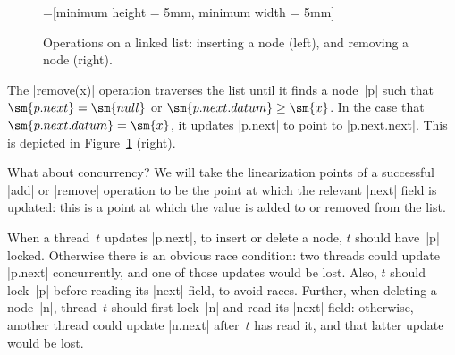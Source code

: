 \begin{figure}
\def\new{red} %
=[minimum height = 5mm, minimum width = 5mm]
\begin{center}
%
\hfil
%
\end{center}
\caption{Operations on a linked list: inserting a node (left), and removing a
  node (right).}
\label{fig:linkedlist-ops}
\end{figure}


The |remove(x)| operation traverses the list until it finds a node~|p| such
that $\sm{p.next} = \sm{null}$ or $\sm{p.next.datum} \ge \sm{x}$.  In the case
that $\sm{p.next.datum} = \sm{x}$, it updates |p.next| to point to
|p.next.next|.  This is depicted in Figure~\ref{fig:linkedlist-ops} (right).

What about concurrency?  We will take the linearization
points of a successful |add| or |remove| operation
to be the point at which the relevant |next| field is updated: this is a point
at which the value is added to or removed from the list.

When a thread~$t$ updates |p.next|, to insert or delete a node, $t$ should
have~|p| locked.  Otherwise there is an obvious race condition: two threads
could update |p.next| concurrently, and one of those updates would be lost.
Also, $t$ should lock~|p| before reading its |next| field, to avoid races.
Further, when deleting a node~|n|, thread~$t$ should first lock~|n| and read
its |next| field: otherwise, another thread could update |n.next| after~$t$
has read it, and that latter update would be lost.

